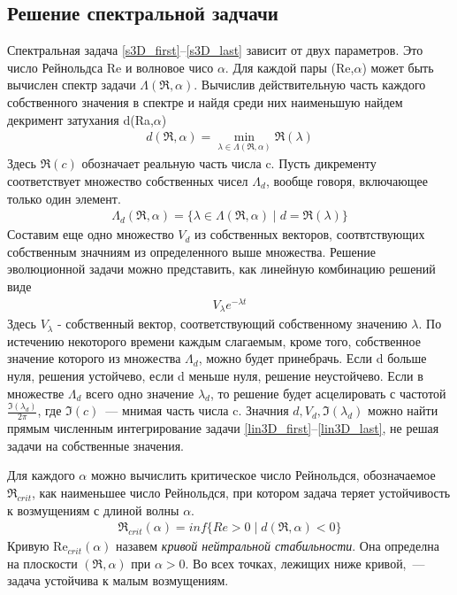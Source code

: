 \subsection*{Решение спектральной задчачи}

Спектральная задача \ref{s3D_first}--\ref{s3D_last} зависит от двух параметров. Это число Рейнольдса Re и волновое чисо $\alpha$. Для каждой пары (Re,$\alpha$) может быть вычислен спектр задачи $\Lambda(\Re,\alpha)$. Вычислив действительную часть каждого собственного значения в спектре и найдя среди них наименьшую найдем декримент затухания d(Ra,$\alpha$)
\begin{gather}
 d(\Re,\alpha) = \min_{\lambda \in \Lambda(\Re,\alpha)} \mathfrak{R}(\lambda)
\end{gather}
Здесь $\mathfrak{R}(c)$ обозначает реальную часть числа c. Пусть дикременту соответствует множество собственных чисел $\Lambda_d$, вообще говоря, включающее только один элемент.
\begin{gather}
 \Lambda_d(\Re,\alpha) = \{ \lambda \in \Lambda(\Re,\alpha) \mid d = \mathfrak{R}(\lambda) \}
\end{gather}
Составим еще одно множество $V_d$ из собственных векторов, соотвтствующих собственным значниям из определенного выше множества. Решение эволюционной задачи можно представить, как линейную комбинацию решений виде 
\begin{gather}
 V_\lambda e^{-\lambda t}
\end{gather}
Здесь $V_\lambda$ - собственный вектор, соответствующий собственному значению $\lambda$. 
По истечению некоторого времени каждым слагаемым, кроме того, собственное значение которого из
множества $\Lambda_d$, можно будет принебрачь. Если d больше нуля, решения устойчево, если d 
меньше нуля, решение неустойчево. Если в множестве $\Lambda_d$ всего одно значение $\lambda_d$, то 
решение будет асцелировать с частотой $\frac{\mathfrak{I}(\lambda_d)}{2\pi}$, где 
$\mathfrak{I}(c)$~--- мнимая часть числа c. Значния $d, V_d, \mathfrak{I}(\lambda_d)$ можно найти 
прямым численным интегрирование задачи \ref{lin3D_first}--\ref{lin3D_last}, не решая задачи на собственные значения.



Для каждого $\alpha$ можно вычислить критическое число Рейнольдся, обозначаемое $\Re_{crit}$, как наименьшее число Рейнольдся, при котором задача теряет устойчивость к возмущениям с длиной волны $\alpha$.
\begin{gather}
 \Re_{crit}(\alpha) = inf\{Re>0 \mid d(\Re,\alpha) < 0\}
\end{gather}
Кривую Re$_{crit}(\alpha)$ назавем \textit{кривой нейтральной стабильности}. Она определна на плоскости $(\Re,\alpha)$ при $\alpha > 0$. Во всех точках, лежищих ниже кривой,~--- задача устойчива к малым возмущениям. 

